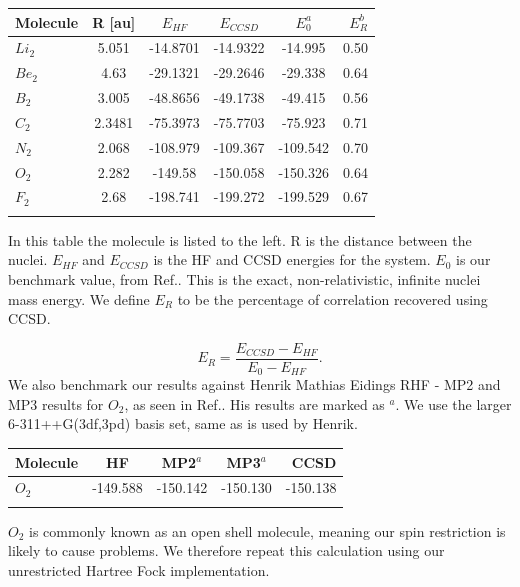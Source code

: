 \documentclass[a4paper,norsk,11pt,twoside]{report}
\begin{document}
\begin{center}
\begin{tabular}{ l c  c c c r }
	\hline
  	Molecule & R [au] & $E_{HF}$ & $E_{CCSD}$ & 	$E_0^a$ & $E_R^b$ \\ \hline
  	$Li_2$ & 5.051 & -14.8701 & -14.9322 & -14.995 &  0.50 \\\hline
  	$Be_2$ & 4.63 & -29.1321 & -29.2646 & -29.338 &  0.64 \\ \hline
  	$B_2$ & 3.005 & -48.8656 & -49.1738 & -49.415 &  0.56 \\ \hline
  	$C_2$ & 2.3481 & -75.3973 & -75.7703 & -75.923 &  0.71 \\ \hline
  	$N_2$ & 2.068 & -108.979 & -109.367 & -109.542 & 0.70 \\ \hline
  	$O_2$ & 2.282 & -149.58 & -150.058 & -150.326 & 0.64  \\ \hline
  	$F_2$ & 2.68 & -198.741 & -199.272 & -199.529 & 0.67 \\ \hline
  	\\
	\end{tabular}
\end{center}

In this table the molecule is listed to the left. R is the distance between the nuclei. $E_{HF}$ and $E_{CCSD}$ is the HF and CCSD energies for the system. $E_0$ is our benchmark value, from Ref.\cite{first_row_diatomic_referance_stuff}. This is the exact, non-relativistic, infinite nuclei mass energy. We define $E_R$ to be the percentage of correlation recovered using CCSD.

\begin{equation}
E_R = \frac{E_{CCSD} - E_{HF}}{E_0 - E_{HF}} .
\end{equation}
We also benchmark our results against Henrik Mathias Eidings RHF - MP2 and MP3 results for $O_2$, as seen in Ref.\cite{hmeiding}. His results are marked as $^a$. We use the larger 6-311++G(3df,3pd) basis set, same as is used by Henrik. 

\begin{center}
\begin{tabular}{ l c c c r }
	\hline
  	Molecule & HF & MP2$^a$ & MP3$^a$ & CCSD \\ \hline
  	$O_2$ & -149.588 & -150.142 & -150.130 & -150.138 \\\hline
  	\\
	\end{tabular}
\end{center}

$O_2$ is commonly known as an open shell molecule, meaning our spin restriction is likely to cause problems. We therefore repeat this calculation using our unrestricted Hartree Fock implementation. \\
\end{document}
